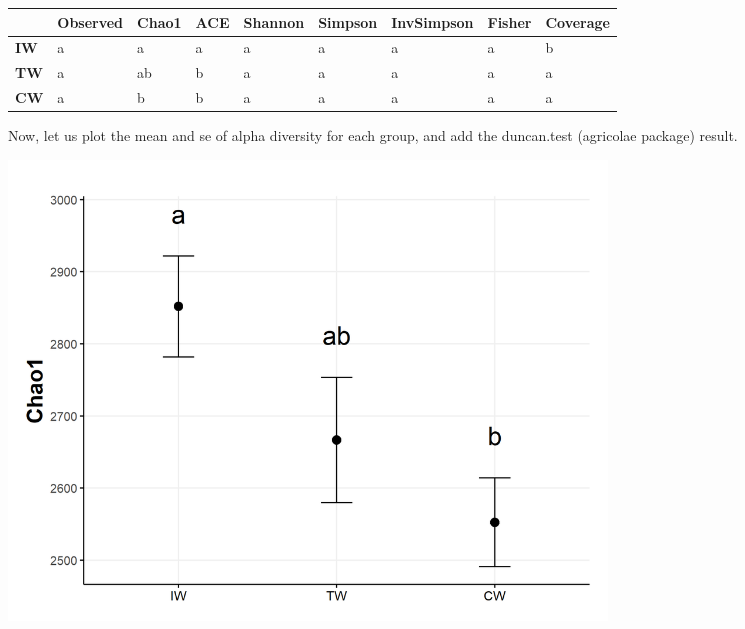 \documentclass[
]{book}
\newenvironment{Shaded}{\begin{snugshade}}{\end{snugshade}}
\newcommand{\AttributeTok}[1]{\textcolor[rgb]{0.77,0.63,0.00}{#1}}
\newcommand{\ConstantTok}[1]{\textcolor[rgb]{0.00,0.00,0.00}{#1}}
\newcommand{\FunctionTok}[1]{\textcolor[rgb]{0.00,0.00,0.00}{#1}}
\newcommand{\NormalTok}[1]{#1}
\newcommand{\SpecialCharTok}[1]{\textcolor[rgb]{0.00,0.00,0.00}{#1}}
\newcommand{\StringTok}[1]{\textcolor[rgb]{0.31,0.60,0.02}{#1}}
\begin{document}
\begin{longtable}[]{@{}
  >{\centering\arraybackslash}p{}
  >{\centering\arraybackslash}p{}
  >{\centering\arraybackslash}p{}
  >{\centering\arraybackslash}p{}
  >{\centering\arraybackslash}p{}
  >{\centering\arraybackslash}p{}
  >{\centering\arraybackslash}p{}
  >{\centering\arraybackslash}p{}
  >{\centering\arraybackslash}p{}@{}}
\toprule
~ & Observed & Chao1 & ACE & Shannon & Simpson & InvSimpson & Fisher & Coverage \\
\midrule
\endhead
\textbf{IW} & a & a & a & a & a & a & a & b \\
\textbf{TW} & a & ab & b & a & a & a & a & a \\
\textbf{CW} & a & b & b & a & a & a & a & a \\
\bottomrule
\end{longtable}

Now, let us plot the mean and se of alpha diversity for each group, and add the duncan.test (agricolae package) result.

\begin{Shaded}
\end{Shaded}

\begin{center}\includegraphics[width=600px]{Images/plot_alpha_letter} \end{center}
\end{document}
